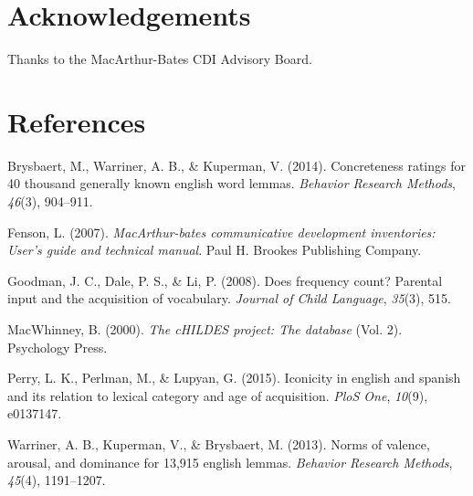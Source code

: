 \documentclass[10pt, letterpaper]{article}
\begin{document}
\section{Acknowledgements}\label{acknowledgements}

Thanks to the MacArthur-Bates CDI Advisory Board.

\section{References}\label{references}

\setlength{\parindent}{-0.1in} \setlength{\leftskip}{0.125in} \noindent

Brysbaert, M., Warriner, A. B., \& Kuperman, V. (2014). Concreteness
ratings for 40 thousand generally known english word lemmas.
\emph{Behavior Research Methods}, \emph{46}(3), 904--911.

Fenson, L. (2007). \emph{MacArthur-bates communicative development
inventories: User's guide and technical manual}. Paul H. Brookes
Publishing Company.

Goodman, J. C., Dale, P. S., \& Li, P. (2008). Does frequency count?
Parental input and the acquisition of vocabulary. \emph{Journal of Child
Language}, \emph{35}(3), 515.

MacWhinney, B. (2000). \emph{The cHILDES project: The database} (Vol.
2). Psychology Press.

Perry, L. K., Perlman, M., \& Lupyan, G. (2015). Iconicity in english
and spanish and its relation to lexical category and age of acquisition.
\emph{PloS One}, \emph{10}(9), e0137147.

Warriner, A. B., Kuperman, V., \& Brysbaert, M. (2013). Norms of
valence, arousal, and dominance for 13,915 english lemmas.
\emph{Behavior Research Methods}, \emph{45}(4), 1191--1207.
\end{document}

